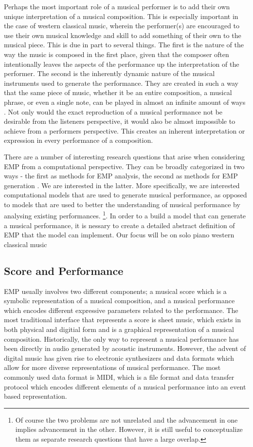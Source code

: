 Perhaps the most important role of a musical performer is to add their own unique interpretation of a musical composition. This is especially important in the case of western classical music, wherein the performer(s) are encouraged to use their own musical knowledge and skill to add something of their own to the musical piece. This is due in part to several things. The first is the nature of the way the music is composed in the first place, given that the composer often intentionally leaves the aspects of the performance up the interpretation of the performer. The second is the inherently dynamic nature of the musical instruments used to generate the performance. They are created in such a way that the same piece of music, whether it be an entire composition, a musical phrase, or even a single note, can be played in almost an infinite amount of ways . Not only would the exact reproduction of a musical performance not be desirable from the listeners perspective, it would also be almost impossible to achieve from a performers perspective. This creates an inherent interpretation or expression in every performance of a composition. 

There are a number of interesting research questions that arise when considering EMP from a computational perspective. They can be broadly categorized in two ways - the first as methods for EMP analysis, the second as methods for EMP generation \cite{cancino2018computational}. We are interested in the latter. More specifically, we are interested computational models that are used to generate musical performance, as opposed to models that are used to better the understanding of musical performance by analysing existing performances. \footnote{Of course the two problems are not unrelated and the advancement in one implies advancement in the other. However, it is still useful to conceptualize them as separate research questions that have a large overlap.}. In order to a build a model that can generate a musical performance, it is nessary to create a detailed abstract definition of EMP that the model can implement. Our focus will be on solo piano western classical music

\subsection{Score and Performance}
EMP usually involves two different components; a musical score which is a symbolic representation of a musical composition, and a musical performance which encodes different expressive parameters related to the performance. The most traditional interface that represents a score is sheet music, which exists in both physical and digitial form and is a graphical representation of a musical composition. Historically, the only way to represent a musical performance has been directly in audio generated by acoustic instruments. However, the advent of digital music has given rise to electronic synthesizers and data formats which allow for more diverse representations of musical performance. The most commonly used data format is MIDI, which is a file format and data transfer protocol which encodes different elements of a musical performance into an event based representation. 

